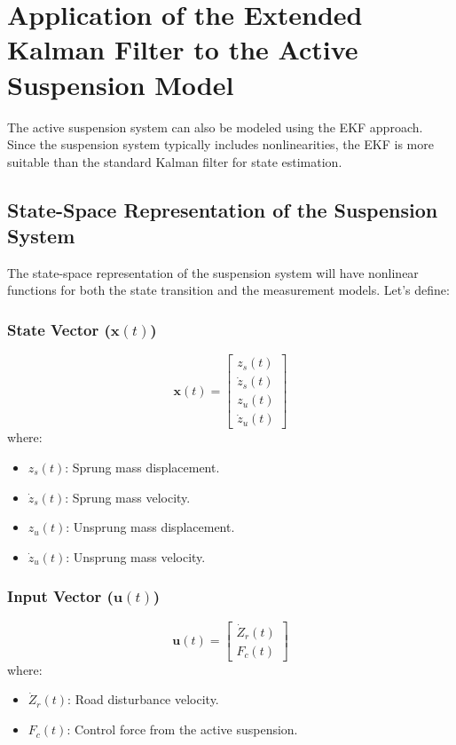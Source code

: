 \section{Application of the Extended Kalman Filter to the Active Suspension Model}

The active suspension system can also be modeled using the EKF approach. Since the suspension system typically includes nonlinearities, the EKF is more suitable than the standard Kalman filter for state estimation.

\subsection {State-Space Representation of the Suspension System}

The state-space representation of the suspension system will have nonlinear functions for both the state transition and the measurement models. Let’s define:

\subsubsection {State Vector (\( \mathbf{x}(t) \))}
\[
\mathbf{x}(t) = \begin{bmatrix}
	z_s(t) \\
	\dot{z}_s(t) \\
	z_u(t) \\
	\dot{z}_u(t)
\end{bmatrix}
\]
where:
\begin{itemize}
	\item \( z_s(t) \): Sprung mass displacement.
	\item \( \dot{z}_s(t) \): Sprung mass velocity.
	\item \( z_u(t) \): Unsprung mass displacement.
	\item \( \dot{z}_u(t) \): Unsprung mass velocity.
\end{itemize}

\subsubsection {Input Vector (\( \mathbf{u}(t) \))}
\[
\mathbf{u}(t) = \begin{bmatrix}
	\dot{Z}_r(t) \\
	F_c(t)
\end{bmatrix}
\]
where:
\begin{itemize}
	\item \( \dot{Z}_r(t) \): Road disturbance velocity.
	\item \( F_c(t) \): Control force from the active suspension.
\end{itemize}

